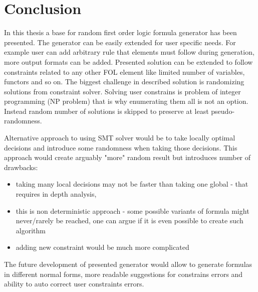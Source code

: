 \chapter{Conclusion}

In this thesis a base for random first order logic formula generator has been presented. The generator can be easily extended for user specific needs. For example user can add arbitrary rule that elements must follow during generation, more output formats can be added.
Presented solution can be extended to follow constraints related to any other \gls{FOL} element like limited number of variables, functors and so on.
The biggest challenge in described solution is randomizing solutions from constraint solver. Solving user constrains is problem of integer programming (NP problem) that is why enumerating them all is not an option. Instead random number of solutions is skipped to preserve at least pseudo-randomness.

Alternative approach to using \gls{SMT} solver would be to take locally optimal decisions and introduce some randomness when taking those decisions. This approach would create arguably "more" random result but introduces number of drawbacks:

\begin{itemize}
  \item taking many local decisions may not be faster than taking one global - that requires in depth analysis,
  \item this is non deterministic approach - some possible variants of formula might never/rarely be reached, one can argue if it is even possible to create such algorithm
  \item adding new constraint would be much more complicated
\end{itemize}

The future development of presented generator would allow to generate formulas in different normal forms, more readable suggestions for constrains errors and ability to auto correct user constraints errors.
